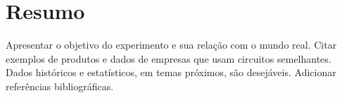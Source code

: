 \chapter{Resumo}
Apresentar  o  objetivo  do  experimento e  sua  relação  com  o  mundo  real. 
Citar exemplos  de  produtos  e  dados  de  empresas  que  usam  circuitos  semelhantes. 
Dados  históricos  e  estatísticos,  em  temas  próximos,  são  desejáveis.
Adicionar referências bibliográficas.